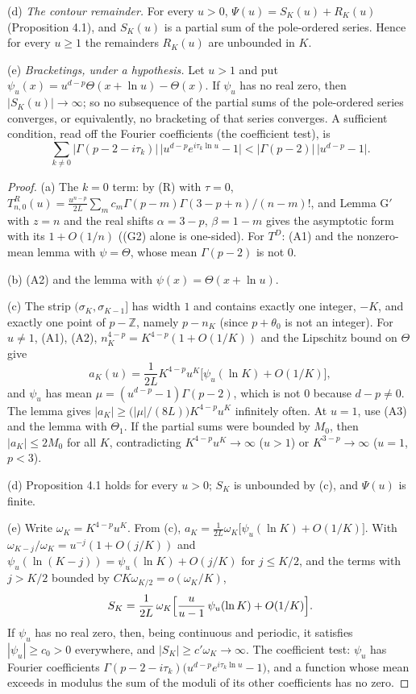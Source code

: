 \documentclass[11pt]{article}
\begin{document}
(d) \emph{The contour remainder.} For every $u>0$, $\Psi(u)=S_K(u)+R_K(u)$ (Proposition 4.1), and $S_K(u)$ is a partial sum of the pole-ordered series. Hence for every $u\ge1$ the remainders $R_K(u)$ are unbounded in $K$.

(e) \emph{Bracketings, under a hypothesis.} Let $u>1$ and put $\psi_u(x)=u^{d-p}\Theta(x+\ln u)-\Theta(x)$. If $\psi_u$ has no real zero, then $|S_K(u)|\to\infty$; so no subsequence of the partial sums of the pole-ordered series converges, or equivalently, no bracketing of that series converges. A sufficient condition, read off the Fourier coefficients (the coefficient test), is
\[
\sum_{k\ne0}|\Gamma(p-2-i\tau_k)|\,\bigl|u^{d-p}e^{i\tau_k\ln u}-1\bigr|<|\Gamma(p-2)|\,\bigl|u^{d-p}-1\bigr|.
\]

\begin{proof}
(a) The $k=0$ term: by (R) with $\tau=0$, $T^R_{n,0}(u)=\frac{u^{n-p}}{2L}\sum_mc_m\Gamma(p-m)\Gamma(3-p+n)/(n-m)!$, and Lemma G$'$ with $z=n$ and the real shifts $\alpha=3-p$, $\beta=1-m$ gives the asymptotic form with its $1+O(1/n)$ ((G2) alone is one-sided). For $T^D$: (A1) and the nonzero-mean lemma with $\psi=\Theta$, whose mean $\Gamma(p-2)$ is not $0$.

(b) (A2) and the lemma with $\psi(x)=\Theta(x+\ln u)$.

(c) The strip $(\sigma_K,\sigma_{K-1}]$ has width $1$ and contains exactly one integer, $-K$, and exactly one point of $p-\mathbb{Z}$, namely $p-n_K$ (since $p+\theta_0$ is not an integer). For $u\ne1$, (A1), (A2), $n_K^{4-p}=K^{4-p}(1+O(1/K))$ and the Lipschitz bound on $\Theta$ give
\[
a_K(u)=\frac{1}{2L}K^{4-p}u^K\bigl[\psi_u(\ln K)+O(1/K)\bigr],
\]
and $\psi_u$ has mean $\mu=(u^{d-p}-1)\Gamma(p-2)$, which is not $0$ because $d-p\ne0$. The lemma gives $|a_K|\ge\bigl(|\mu|/(8L)\bigr)K^{4-p}u^K$ infinitely often. At $u=1$, use (A3) and the lemma with $\Theta_1$. If the partial sums were bounded by $M_0$, then $|a_K|\le2M_0$ for all $K$, contradicting $K^{4-p}u^K\to\infty$ ($u>1$) or $K^{3-p}\to\infty$ ($u=1$, $p<3$).

(d) Proposition 4.1 holds for every $u>0$; $S_K$ is unbounded by (c), and $\Psi(u)$ is finite.

(e) Write $\omega_K=K^{4-p}u^K$. From (c), $a_K=\frac{1}{2L}\omega_K\bigl[\psi_u(\ln K)+O(1/K)\bigr]$. With $\omega_{K-j}/\omega_K=u^{-j}(1+O(j/K))$ and $\psi_u(\ln(K-j))=\psi_u(\ln K)+O(j/K)$ for $j\le K/2$, and the terms with $j>K/2$ bounded by $CK\omega_{K/2}=o(\omega_K/K)$,
\[
S_K=\frac{1}{2L}\,\omega_K\Bigl[\frac{u}{u-1}\,\psi_u(\ln K)+O(1/K)\Bigr].
\]
If $\psi_u$ has no real zero, then, being continuous and periodic, it satisfies $|\psi_u|\ge c_0>0$ everywhere, and $|S_K|\ge c'\omega_K\to\infty$. The coefficient test: $\psi_u$ has Fourier coefficients $\Gamma(p-2-i\tau_k)\bigl(u^{d-p}e^{i\tau_k\ln u}-1\bigr)$, and a function whose mean exceeds in modulus the sum of the moduli of its other coefficients has no zero.
\end{proof}
\end{document}
